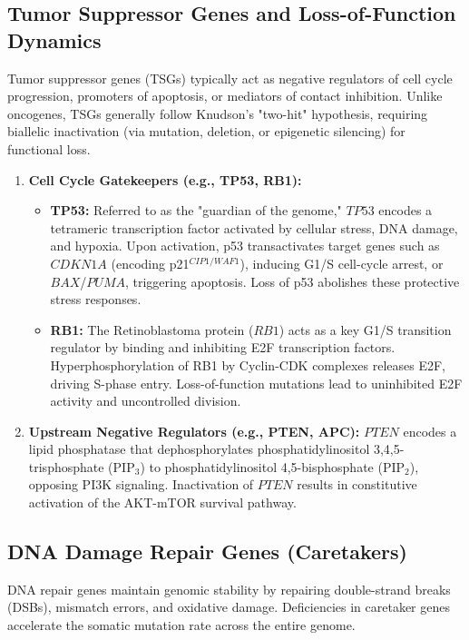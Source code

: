 \documentclass{article}
\begin{document}
\subsection{Tumor Suppressor Genes and Loss-of-Function Dynamics}

Tumor suppressor genes (TSGs) typically act as negative regulators of cell cycle progression, promoters of apoptosis, or mediators of contact inhibition. Unlike oncogenes, TSGs generally follow Knudson's "two-hit" hypothesis, requiring biallelic inactivation (via mutation, deletion, or epigenetic silencing) for functional loss.

\begin{enumerate}
    \item \textbf{Cell Cycle Gatekeepers (e.g., TP53, RB1):}
    \begin{itemize}
        \item \textbf{TP53:} Referred to as the "guardian of the genome," $TP53$ encodes a tetrameric transcription factor activated by cellular stress, DNA damage, and hypoxia. Upon activation, p53 transactivates target genes such as $CDKN1A$ (encoding p21$^{CIP1/WAF1}$), inducing G1/S cell-cycle arrest, or $BAX$/$PUMA$, triggering apoptosis. Loss of p53 abolishes these protective stress responses.
        \item \textbf{RB1:} The Retinoblastoma protein ($RB1$) acts as a key G1/S transition regulator by binding and inhibiting E2F transcription factors. Hyperphosphorylation of RB1 by Cyclin-CDK complexes releases E2F, driving S-phase entry. Loss-of-function mutations lead to uninhibited E2F activity and uncontrolled division.
    \end{itemize}
    \item \textbf{Upstream Negative Regulators (e.g., PTEN, APC):}
    $PTEN$ encodes a lipid phosphatase that dephosphorylates phosphatidylinositol 3,4,5-trisphosphate ($\text{PIP}_3$) to phosphatidylinositol 4,5-bisphosphate ($\text{PIP}_2$), opposing PI3K signaling. Inactivation of $PTEN$ results in constitutive activation of the AKT-mTOR survival pathway.
\end{enumerate}

\subsection{DNA Damage Repair Genes (Caretakers)}

DNA repair genes maintain genomic stability by repairing double-strand breaks (DSBs), mismatch errors, and oxidative damage. Deficiencies in caretaker genes accelerate the somatic mutation rate across the entire genome.
\end{document}
